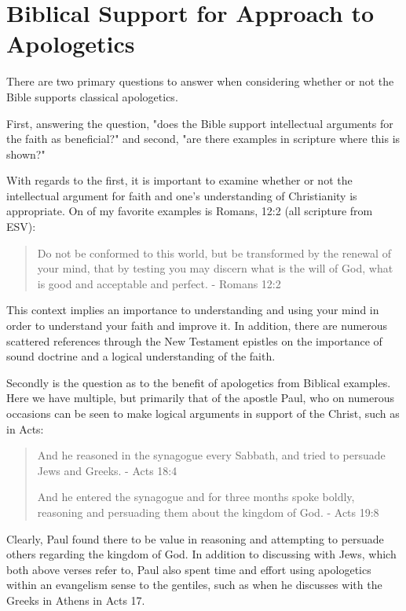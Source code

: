 \documentclass[12pt]{turabian-researchpaper}
\begin{document}
\section{Biblical Support for Approach to Apologetics}

There are two primary questions to answer when considering whether or not the Bible supports classical apologetics.

First, answering the question, "does the Bible support intellectual arguments for the faith as beneficial?" and second, "are there examples in scripture where this is shown?"

With regards to the first, it is important to examine whether or not the intellectual argument for faith and one's understanding of Christianity is appropriate. On of my favorite examples is Romans, 12:2 (all scripture from ESV):

\begin{quotation}
Do not be conformed to this world, but be transformed by the renewal of your mind, that by testing you may discern what is the will of God, what is good and acceptable and perfect.\autocite{bible2002wheaton} - Romans 12:2
\end{quotation}

This context implies an importance to understanding and using your mind in order to understand your faith and improve it. In addition, there are numerous scattered references through the New Testament epistles on the importance of sound doctrine and a logical understanding of the faith. 

Secondly is the question as to the benefit of apologetics from Biblical examples. Here we have multiple, but primarily that of the apostle Paul, who on numerous occasions can be seen to make logical arguments in support of the Christ, such as in Acts:

\begin{quotation}
And he reasoned in the synagogue every Sabbath, and tried to persuade Jews and Greeks. - Acts 18:4

And he entered the synagogue and for three months spoke boldly, reasoning and persuading them about the kingdom of God. - Acts 19:8
\end{quotation}

Clearly, Paul found there to be value in reasoning and attempting to persuade others regarding the kingdom of God. In addition to discussing with Jews, which both above verses refer to, Paul also spent time and effort using apologetics within an evangelism sense to the gentiles, such as when he discusses with the Greeks in Athens in Acts 17. 
\end{document}

